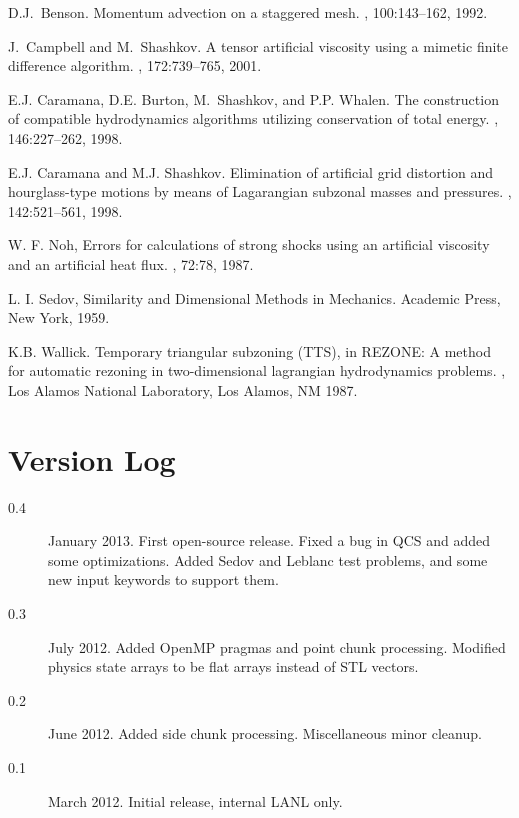 \documentclass[11pt,letterpaper]{article} %
\begin{document}
\begin{thebibliography}{9}


D.J.~Benson.
\newblock Momentum advection on a staggered mesh.
, 100:143--162, 1992.

J.~Campbell and M.~Shashkov.
\newblock A tensor artificial viscosity using a mimetic finite difference
  algorithm.
, 172:739--765, 2001.

E.J. Caramana, D.E. Burton, M.~Shashkov, and P.P. Whalen.
\newblock The construction of compatible hydrodynamics algorithms utilizing
  conservation of total energy.
, 146:227--262, 1998.

E.J. Caramana and M.J. Shashkov.
\newblock Elimination of artificial grid distortion and hourglass-type motions
  by means of {L}agarangian subzonal masses and pressures.
, 142:521--561, 1998.

W. F. Noh,
\newblock Errors for calculations of strong shocks using an artificial viscosity and an artificial heat flux.
, 72:78, 1987.

L. I. Sedov,
\newblock Similarity and Dimensional Methods in Mechanics.
\newblock Academic Press, New York, 1959.

K.B. Wallick.
\newblock Temporary triangular subzoning ({TTS}), in {REZONE}: A method for
  automatic rezoning in two-dimensional lagrangian hydrodynamics problems.
, Los Alamos National Laboratory, Los
  Alamos, NM 1987.

\end{thebibliography}

\appendix
\section{Version Log}

\begin{description}
\item[0.4] January 2013.  First open-source release.
Fixed a bug in QCS and added some optimizations.
Added Sedov and Leblanc test problems, and some new input keywords to
support them.
\item[0.3] July 2012.  Added OpenMP pragmas and point chunk processing.
Modified physics state arrays to be flat arrays instead of STL vectors.
\item[0.2] June 2012.  Added side chunk processing.  Miscellaneous minor cleanup.
\item[0.1] March 2012.  Initial release, internal LANL only.
\end{description}
\end{document}
